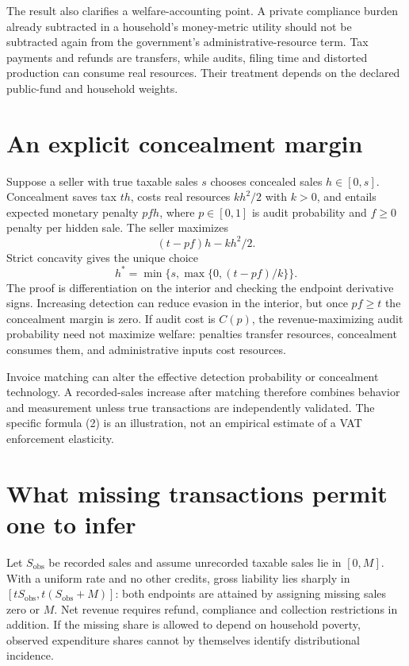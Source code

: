 \documentclass[11pt,a4paper]{article}
\begin{document}
The result also clarifies a welfare-accounting point. A private compliance burden already subtracted in a household's money-metric utility should not be subtracted again from the government's administrative-resource term. Tax payments and refunds are transfers, while audits, filing time and distorted production can consume real resources. Their treatment depends on the declared public-fund and household weights.

\section{An explicit concealment margin}
Suppose a seller with true taxable sales $s$ chooses concealed sales $h\in[0,s]$. Concealment saves tax $th$, costs real resources $kh^2/2$ with $k>0$, and entails expected monetary penalty $pfh$, where $p\in[0,1]$ is audit probability and $f\ge0$ penalty per hidden sale. The seller maximizes
\[
 (t-pf)h-kh^2/2.
\]
Strict concavity gives the unique choice
\[
 h^*=\min\{s,\max\{0,(t-pf)/k\}\}. \tag{2}
\]
The proof is differentiation on the interior and checking the endpoint derivative signs. Increasing detection can reduce evasion in the interior, but once $pf\ge t$ the concealment margin is zero. If audit cost is $C(p)$, the revenue-maximizing audit probability need not maximize welfare: penalties transfer resources, concealment consumes them, and administrative inputs cost resources.

Invoice matching can alter the effective detection probability or concealment technology. A recorded-sales increase after matching therefore combines behavior and measurement unless true transactions are independently validated. The specific formula (2) is an illustration, not an empirical estimate of a VAT enforcement elasticity.

\section{What missing transactions permit one to infer}
Let $S_{\mathrm{obs}}$ be recorded sales and assume unrecorded taxable sales lie in $[0,M]$. With a uniform rate and no other credits, gross liability lies sharply in $[tS_{\mathrm{obs}},t(S_{\mathrm{obs}}+M)]$: both endpoints are attained by assigning missing sales zero or $M$. Net revenue requires refund, compliance and collection restrictions in addition. If the missing share is allowed to depend on household poverty, observed expenditure shares cannot by themselves identify distributional incidence.
\end{document}
